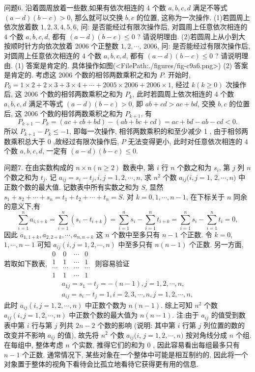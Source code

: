 问题6. 沿着圆周放着一些数,如果有依次相连的 4 个数 $a, b, c, d$ 满足不等式 $(a-d)(b-c)>0$, 那么就可以交换 $b, c$ 的位置, 这称为一次操作.
(1)若圆周上依次放着数 $1,2,3,4,5,6$, 问: 是否能经过有限次操作后, 对圆周上任意依次相连的 4 个数 $a, b, c, d$, 都有 $(a-d)(b-c) \leqslant 0$ ? 请说明理由.
(2)若圆周上从小到大按顺时针方向依次放着 2006 个正整数 $1,2, \cdots$, 2006, 问: 是否能经过有限次操作后, 对圆周上任意依次相连的 4 个数 $a, b, c, d$, 都有 $(a-d)(b-c) \leqslant 0$ ? 请说明理由.
(1) 答案是肯定的.
具体操作如图(<FilePath:./figures/fig-c9a6.png>)
(2) 答案是肯定的.
考虑这 2006 个数的相邻两数乘积之和为 $P$.
开始时, $P_0=1 \times 2+2 \times 3+3 \times 4+\cdots+2005 \times 2006+2006 \times 1$, 经过 $k(k \geqslant 0)$ 次操作后, 这 2006 个数的相邻两数乘积之和为 $P_k$, 此时若圆周上依次相连的 4 个数 $a, b, c, d$ 满足不等式 $(a-d)(b-c)>0$, 即 $a b+c d>a c+ b d$, 交换 $b, c$ 的位置后, 这 2006 个数的相邻两数乘积之和为 $P_{k+1}$, 有
$$
P_{k+1}-P_k=(a c+c b+b d)-(a b+b c+c d)=a c+b d-a b-c d<0 .
$$
所以 $P_{k+1}-P_k \leqslant-1$, 即每一次操作, 相邻两数乘积的和至少减少 1 , 由于相邻两数乘积总大于 0 ,故经过有限次操作后, $P$ 无法变得更小, 此时对任意依次相连的 4 个数 $a, b, c, d$, 一定有 $(a-d)(b-c) \leqslant 0$.



问题7. 在由实数构成的 $n \times n(n \geqslant 2)$ 数表中, 第 $i$ 行 $n$ 个数之和为 $s_i$, 第 $j$ 列 $n$ 个数之和为 $t_j$. 记 $a_{i j}=s_i-t_j, i, j=1,2, \cdots, n$, 求 $n^2$ 个数 $a_{i j} ( i, j=1$, $2, \cdots, n)$ 中正数个数的最大值.
记数表中所有实数之和为 $S$, 显然 $s_1+s_2+\cdots+s_n=t_1+t_2+\cdots+ t_n=S$. 对 $k=0,1, \cdots, n-1$, 在下标关于 $n$ 同余的意义下,有
$$
\sum_{i=1}^n a_{i, i+k}=\sum_{i=1}^n\left(s_i-t_{i+k}\right)=\sum_{i=1}^n s_i-\sum_{i=1}^n t_{i+k}=\sum_{i=1}^n s_i-\sum_{i=1}^n t_i=0,
$$
因此 $a_{1,1+k}, a_{2,2+k}, \cdots, a_{n, n+k}$ 这 $n$ 个数中至多只有 $n-1$ 个正数.
令 $k=0$, $1, \cdots, n-1$ 可知 $a_{i j}(i, j=1,2, \cdots, n)$ 中至多只有 $n(n-1)$ 个正数.
另一方面, 若取如下数表,
$\begin{array}{cccc}0 & 0 & \cdots & 0 \\ 1 & 1 & \cdots & 1 \\ \cdots & \cdots & \cdots & \cdots \\ 1 & 1 & \cdots & 1\end{array}$
则容易验证
$$
\begin{gathered}
a_{1 j}=s_1-t_j=-(n-1), j=1,2, \cdots, n, \\
a_{i j}=s_i-t_j=1, i=2,3, \cdots, n, j=1,2, \cdots, n,
\end{gathered}
$$
此时 $a_{i j}(i, j=1,2, \cdots, n)$ 中正数个数为 $n(n-1)$.
综上可知 $n^2$ 个数 $a_{i j}(i, j=1,2, \cdots, n)$ 中正数个数的最大值为 $n(n-1)$.
注:由于 $a_{i j}$ 的值受到数表中第 $i$ 行与第 $j$ 列共 $2 n-2$ 个数的影响 (说明: 其中第 $i$ 行第 $j$ 列位置的数的改变并不影响 $a_{i j}$ 的值), 故先将 $n^2$ 个数 $a_{i j}(i$, $j=1,2, \cdots, n)$ 按对角线分成 $n$ 个组.
在每组中, 整体考虑 $n$ 个实数, 推得它们的和为 0 , 因此容易看出每组最多只有 $n-1$ 个正数.
通常情况下, 某些对象在一个整体中可能是相互制约的, 因此将一个对象置于整体的视角下看待会比孤立地看待它获得更有用的信息.


